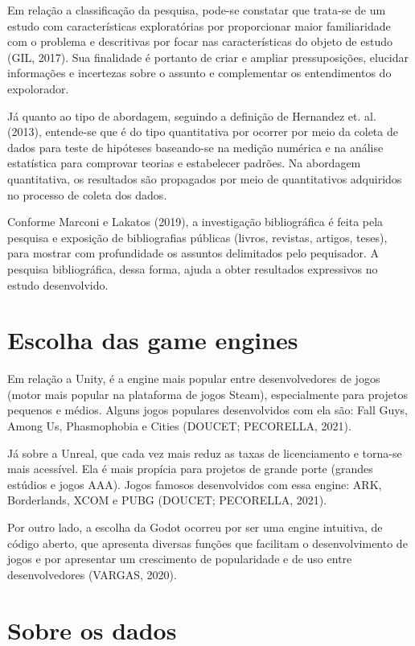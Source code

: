 Em relação a classificação da pesquisa, pode-se constatar que trata-se de um estudo com características exploratórias por proporcionar maior familiaridade com o problema e descritivas por focar nas características do objeto de estudo (GIL, 2017). Sua finalidade é portanto de criar e ampliar pressuposições, elucidar informações e incertezas sobre o assunto e complementar os entendimentos do expolorador.

Já quanto ao tipo de abordagem, seguindo a definição de Hernandez et. al. (2013)\nocite{hernandez2013}, entende-se que é do tipo quantitativa por ocorrer por meio da coleta de dados para teste de hipóteses baseando-se na medição numérica e na análise estatística para comprovar teorias e estabelecer padrões. Na abordagem quantitativa, os resultados são propagados por meio de quantitativos adquiridos no processo de coleta dos dados.

Conforme Marconi e Lakatos (2019)\nocite{marconi2019}, a investigação bibliográfica é feita pela pesquisa e exposição de bibliografias públicas (livros, revistas, artigos, teses), para mostrar com profundidade os assuntos delimitados pelo pequisador. A pesquisa bibliográfica, dessa forma, ajuda a obter resultados expressivos no estudo desenvolvido. 

\section{Escolha das game engines}
\label{sec:escolha-das-game-engines}

Em relação a Unity, é a engine mais popular entre desenvolvedores de jogos (motor mais popular na plataforma de jogos Steam), especialmente para projetos pequenos e médios. Alguns jogos populares desenvolvidos com ela são: Fall Guys, Among Us, Phasmophobia e Cities (DOUCET; PECORELLA, 2021)\nocite{lars2021}.

Já sobre a Unreal, que cada vez mais reduz as taxas de licenciamento e torna-se mais acessível. Ela é mais propícia para projetos de grande porte (grandes estúdios e jogos AAA). Jogos famosos desenvolvidos com essa engine: ARK, Borderlands, XCOM e PUBG (DOUCET; PECORELLA, 2021).

Por outro lado, a escolha da Godot ocorreu por ser uma engine intuitiva, de código aberto, que apresenta diversas funções que facilitam o desenvolvimento de jogos e por apresentar um crescimento de popularidade e de uso entre desenvolvedores (VARGAS, 2020)\nocite{vargas2020}. 

\section{Sobre os dados}
\label{sec:sobre-os-dados}

